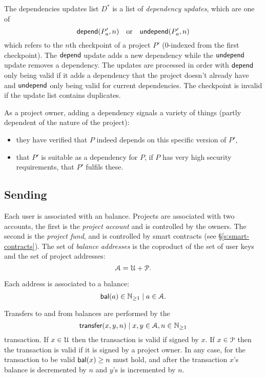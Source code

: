 The dependencies updates list $D^*$ is a list of \emph{dependency
  updates}, which are one of
\[
    \mathsf{depend}(P'_a, n) \quad \text{or} \quad \mathsf{undepend}(P'_a, n)
\]
which refers to the $n$th checkpoint of a project $P'$ ($0$-indexed
from the first checkpoint). The $\mathsf{depend}$ update adds a new dependency
while the $\mathsf{undepend}$ update removes a dependency. The updates are
processed in order with $\mathsf{depend}$ only being valid if it adds a
dependency that the project doesn't already have and $\mathsf{undepend}$
only being valid for current dependencies. The checkpoint is invalid
if the update list contains duplicates.

As a project owner, adding a dependency signals a variety of things
(partly dependent of the nature of the project):
\begin{itemize}
\item they have verified that $P$ indeed depends on this specific
  version of $P'$,
\item that $P'$ is suitable as a dependency for $P$, \eg{} if $P$ has
  very high security requirements, that $P'$ fulfils these.
\end{itemize}


\def\posnat{\mathbb{N}_{\geq 1}}

\subsection{Sending \oscoin{}}
\label{s:sending}

Each user is associated with an \oscoin{} balance. Projects are associated with
two accounts, the first is the \emph{project account} and is controlled by the
owners. The second is the \emph{project fund}, and is controlled by smart
contracts (see \S \ref{s:smart-contracts}). The set of \emph{balance addresses}
is the coproduct of the set of user keys and the set of project addresses:
\[
\mathcal{A} = \mathcal{U} + \mathcal{P}.
\]

Each address is associated to a balance:
\[
\bal(a) \in \posnat \mid a \in \accAddrs.
\]

Transfers to and from balances are performed by the
\[
\tx{transfer}{x,y,n} \mid x,y \in \accAddrs, n \in \posnat
\]
transaction. If $x \in \mathcal{U}$ then the transaction is valid if signed by
$x$. If $x \in \mathcal{P}$ then the transaction is valid if it is signed by a
project owner. In any case, for the transaction to be valid $\mathsf{bal}(x) \geq n$
must hold, and after the transaction $x$'s balance is decremented by $n$ and
$y$'s is incremented by $n$.

